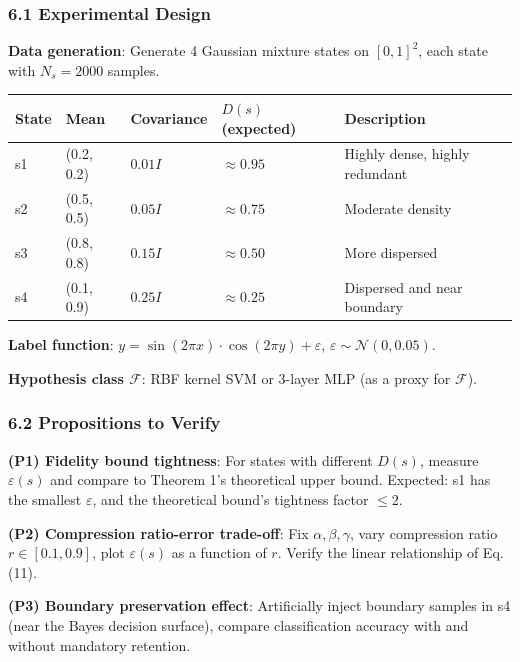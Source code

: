 \documentclass[
  12pt,
]{article}
\begin{document}
\subsubsection{6.1 Experimental Design}\label{experimental-design}

\textbf{Data generation}: Generate 4 Gaussian mixture states on \([0, 1]^2\), each state with
\(N_s = 2000\) samples.

\begin{longtable}[]{@{}lllll@{}}
\toprule\noalign{}
State & Mean & Covariance & \(D(s)\) (expected) & Description \\
\midrule\noalign{}
\endhead
\bottomrule\noalign{}
\endlastfoot
s1 & (0.2, 0.2) & \(0.01 I\) & \(\approx 0.95\) & Highly dense, highly redundant \\
s2 & (0.5, 0.5) & \(0.05 I\) & \(\approx 0.75\) & Moderate density \\
s3 & (0.8, 0.8) & \(0.15 I\) & \(\approx 0.50\) & More dispersed \\
s4 & (0.1, 0.9) & \(0.25 I\) & \(\approx 0.25\) & Dispersed and near boundary \\
\end{longtable}

\textbf{Label function}: \(y = \sin(2\pi x) \cdot \cos(2\pi y) + \varepsilon\), \(\varepsilon \sim \mathcal{N}(0, 0.05)\).

\textbf{Hypothesis class \(\mathcal{F}\)}: RBF kernel SVM or 3-layer MLP (as a proxy for \(\mathcal{F}\)).

\subsubsection{6.2 Propositions to Verify}\label{propositions-to-verify}

\textbf{(P1) Fidelity bound tightness}: For states with different \(D(s)\), measure
\(\varepsilon(s)\) and compare to Theorem 1's theoretical upper bound. Expected: s1 has the smallest
\(\varepsilon\), and the theoretical bound's tightness factor \(\leq 2\).

\textbf{(P2) Compression ratio-error trade-off}: Fix
\(\alpha, \beta, \gamma\), vary compression ratio \(r \in [0.1, 0.9]\), plot
\(\varepsilon(s)\) as a function of \(r\). Verify the linear relationship of Eq. (11).

\textbf{(P3) Boundary preservation effect}: Artificially inject boundary samples in s4 (near the Bayes decision surface), compare classification accuracy with and without mandatory retention.
\end{document}

